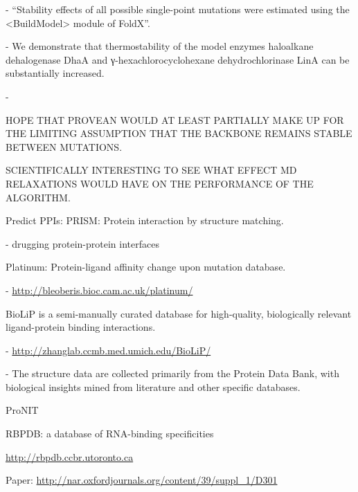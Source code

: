   - ``Stability effects of all possible single-point mutations were estimated using the <BuildModel> module of FoldX''.

  - We demonstrate that thermostability of the model enzymes haloalkane dehalogenase DhaA and γ-hexachlorocyclohexane dehydrochlorinase LinA can be substantially increased.

  - \cite{bednar_fireprot:_2015}



HOPE THAT PROVEAN WOULD AT LEAST PARTIALLY MAKE UP FOR THE LIMITING ASSUMPTION THAT THE BACKBONE REMAINS STABLE BETWEEN MUTATIONS.

SCIENTIFICALLY INTERESTING TO SEE WHAT EFFECT MD RELAXATIONS WOULD HAVE ON THE PERFORMANCE OF THE ALGORITHM.

Predict PPIs: PRISM: Protein interaction by structure matching.


- drugging protein-protein interfaces \cite{wells_reaching_2007}

Platinum: Protein-ligand affinity change upon mutation database.

- \url{http://bleoberis.bioc.cam.ac.uk/platinum/}

BioLiP is a semi-manually curated database for high-quality, biologically relevant ligand-protein binding interactions.

- \url{http://zhanglab.ccmb.med.umich.edu/BioLiP/}

- The structure data are collected primarily from the Protein Data Bank, with biological insights mined from literature and other specific databases.


ProNIT

RBPDB: a database of RNA-binding specificities

\url{http://rbpdb.ccbr.utoronto.ca}

Paper: \url{http://nar.oxfordjournals.org/content/39/suppl_1/D301}

